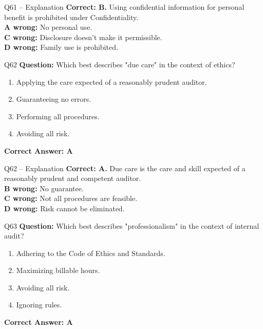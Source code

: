 \documentclass[aspectratio=169,10pt]{beamer}
\begin{document}
	\begin{frame}[t]{Q61 -- Explanation}
		\small
		\textbf{Correct: B.} Using confidential information for personal benefit is prohibited under Confidentiality. \\[4pt]
		\textbf{A wrong:} No personal use. \\[2pt]
		\textbf{C wrong:} Disclosure doesn't make it permissible. \\[2pt]
		\textbf{D wrong:} Family use is prohibited.
	\end{frame}
	
	\begin{frame}[t]{Q62}
		\small
		\textbf{Question:} Which best describes "due care" in the context of ethics?
		\begin{enumerate}[label=\Alph*.,itemsep=1pt,topsep=2pt]
			\item Applying the care expected of a reasonably prudent auditor.
			\item Guaranteeing no errors.
			\item Performing all procedures.
			\item Avoiding all risk.
		\end{enumerate}
		\vspace{4pt}
		\textbf{Correct Answer: A}
	\end{frame}
	
	\begin{frame}[t]{Q62 -- Explanation}
		\small
		\textbf{Correct: A.} Due care is the care and skill expected of a reasonably prudent and competent auditor. \\[4pt]
		\textbf{B wrong:} No guarantee. \\[2pt]
		\textbf{C wrong:} Not all procedures are feasible. \\[2pt]
		\textbf{D wrong:} Risk cannot be eliminated.
	\end{frame}
	
	\begin{frame}[t]{Q63}
		\small
		\textbf{Question:} Which best describes "professionalism" in the context of internal audit?
		\begin{enumerate}[label=\Alph*.,itemsep=1pt,topsep=2pt]
			\item Adhering to the Code of Ethics and Standards.
			\item Maximizing billable hours.
			\item Avoiding all risk.
			\item Ignoring rules.
		\end{enumerate}
		\vspace{4pt}
		\textbf{Correct Answer: A}
	\end{frame}
	
\end{document}
